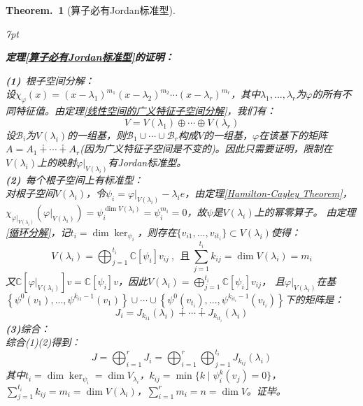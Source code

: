 \documentclass[zihao=-4,UTF8]{report}
\theoremstyle{mystyle} %
\newtheorem{theorem}{Theorem.\,}
\newenvironment{graybox}{%
\def\FrameCommand{%
\hspace{1pt}%
{\color{gray}\small \vrule width 2pt}%
{\color{graybox_color}\vrule width 4pt}%
\colorbox{graybox_color}%
}%
\MakeFramed{\advance\hsize-\width\FrameRestore}%
\noindent\hspace{-4.55pt}%
\begin{adjustwidth}{}{7pt}%
\vspace{2pt}\vspace{2pt}%
}
{%
\vspace{2pt}\end{adjustwidth}\endMakeFramed%
}
\begin{document}
\begin{theorem}[算子必有Jordan标准型]
\noindent
\begin{graybox}
\textbf{定理\ref{算子必有Jordan标准型}的证明：}\par
\noindent 
\textbf{(1)}\ 根子空间分解：\\
设$\chi_{\varphi}(x) = (x-\lambda_1)^{m_1}(x-\lambda_2)^{m_2} \cdots (x-\lambda_r)^{m_r}$，其中$\lambda_1,...,\lambda_r$为$\varphi$的所有不同特征值。由定理\ref{线性空间的广义特征子空间分解}，我们有：
\begin{equation*}
    V = V(\lambda_1) \oplus \cdots \oplus V(\lambda_r)
\end{equation*}
设$\mathcal{B}_i$为$V(\lambda_i)$的一组基，则$\mathcal{B}_1 \cup \cdots \cup \mathcal{B}_r$构成$V$的一组基，$\varphi$在该基下的矩阵$A = A_1 \dotplus \cdots \dotplus A_r$(因为广义特征子空间是不变的)。因此只需要证明，限制在$V(\lambda_i)$上的映射$\varphi|_{V(\lambda_i)}$有Jordan标准型。\\
\textbf{(2)}\ 每个根子空间上有标准型：\\
对根子空间$V(\lambda_i)$，令$\psi_i = \varphi|_{V(\lambda_i)} - \lambda_i e$，由定理\ref{Hamilton-Cayley Theorem}，
$\chi_{\varphi|_{V(\lambda_i)}}(\varphi|_{V(\lambda_i)}) = \psi_i^{\dim V(\lambda_i)} = \psi_i^{m_i} = 0$，故$\psi$是$V(\lambda_i)$上的幂零算子。
由定理\ref{循环分解}，记$t_i = \dim \ker_{\psi_i}$，则存在$\{v_{i1},...,v_{it_i}\} \subset V(\lambda_i) $使得：
\begin{equation*}
    V(\lambda_i) =  \bigoplus_{j =1}^{t_i}\mathbb{C}[\psi_i]v_{ij}\ ,\ \ \text{且}\ \sum_{j=1}^{t_i}k_{ij}= \dim V(\lambda_i) = m_i
\end{equation*}
又$\mathbb{C}[\varphi|_{V(\lambda_i)}]v = \mathbb{C}[\psi_i]v$，因此$V(\lambda_i) =  \bigoplus_{j =1}^{t_i}\mathbb{C}[\psi_i]v_{ij}$，
且$\varphi|_{V(\lambda_i)}$在基$\left\{\psi^0 (v_1),...,\psi^{k_{i1}-1}(v_1)\right\} \cup \cdots \cup \left\{\psi^0 (v_{t_i}),...,\psi^{k_{it_i}-1}(v_{t_i})\right\}$下的矩阵是：
\begin{equation*}
    J_i = J_{k_{i1}}(\lambda_i) \dotplus \cdots \dotplus J_{k_{it_i}}(\lambda_i)
\end{equation*}
\textbf{(3)}综合：\\
综合(1)(2)得到：
\begin{equation*}
    J = \bigoplus_{i=1}^{r}J_i = \bigoplus_{i=1}^{r}\bigoplus_{j=1}^{t_i} J_{k_{ij}}(\lambda_i)
\end{equation*}
其中$t_i = \dim \ker_{\psi_i} = \dim V_{\lambda_i}$，$k_{ij}= \min \{k\mid \psi_i^k(v_j) = 0 \}$，$\sum_{j=1}^{t_i} k_{ij} = m_i = \dim V(\lambda_i)$，$\sum_{i=1}^{r}m_i = n = \dim V$。证毕。
\end{graybox}
\end{theorem}
\end{document}
